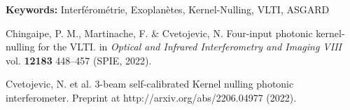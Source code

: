 \documentclass[12pt]{article}
\begin{document}
\textbf{\large Keywords:} Interférométrie, Exoplanètes, Kernel-Nulling, VLTI, ASGARD 

\begin{thebibliography}{60}

 Chingaipe, P. M., Martinache, F. \& Cvetojevic, N. Four-input photonic kernel-nulling for the VLTI. in {\it Optical and Infrared Interferometry and Imaging VIII} vol. \textbf{12183} 448–457 (SPIE, 2022).

 Cvetojevic, N. et al. 3-beam self-calibrated Kernel nulling photonic interferometer. Preprint at http://arxiv.org/abs/2206.04977 (2022).

\end{thebibliography}
\end{document}
